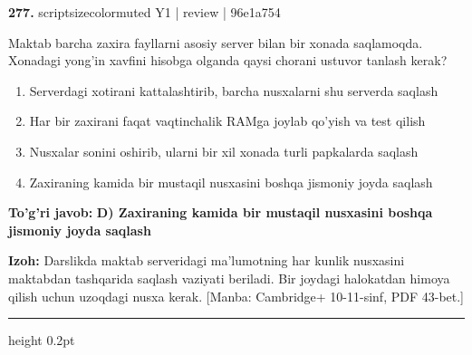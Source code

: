 \documentclass[10pt,a4paper]{article}
\begin{document}
{\bfseries\sffamily\color{ink} 277.} {scriptsizecolor{muted} Y1 | review | 96e1a754}
\par
Maktab barcha zaxira fayllarni asosiy server bilan bir xonada saqlamoqda. Xonadagi yong'in xavfini hisobga olganda qaysi chorani ustuvor tanlash kerak?
\begin{enumerate}[label=\Alph*),leftmargin=9mm]
\item Serverdagi xotirani kattalashtirib, barcha nusxalarni shu serverda saqlash
\item Har bir zaxirani faqat vaqtinchalik RAMga joylab qo'yish va test qilish
\item Nusxalar sonini oshirib, ularni bir xil xonada turli papkalarda saqlash
\item Zaxiraning kamida bir mustaqil nusxasini boshqa jismoniy joyda saqlash
\end{enumerate}
\begin{tcolorbox}[enhanced,breakable,colback=teal!4,colframe=teal!60!black,boxrule=0.45pt,arc=1.2mm,left=2.7mm,right=2.7mm,top=1.8mm,bottom=1.8mm,before skip=2mm,after skip=2mm]
{\bfseries\sffamily\color{teal}To'g'ri javob:} \textbf{D) Zaxiraning kamida bir mustaqil nusxasini boshqa jismoniy joyda saqlash}
\par\smallskip
{\bfseries Izoh:} Darslikda maktab serveridagi ma'lumotning har kunlik nusxasini maktabdan tashqarida saqlash vaziyati beriladi. Bir joydagi halokatdan himoya qilish uchun uzoqdagi nusxa kerak. [Manba: Cambridge+ 10-11-sinf, PDF 43-bet.]
\end{tcolorbox}
\vspace{2mm}\hrule height 0.2pt\vspace{3mm}
\end{document}

